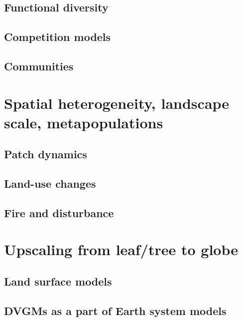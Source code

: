 \documentclass[]{book}
\begin{document}

\section{Functional diversity}\label{functional-diversity}

\section{Competition models}\label{competition-models}

\section{Communities}\label{communities}

\chapter{Spatial heterogeneity, landscape scale,
metapopulations}\label{spatial-heterogeneity-landscape-scale-metapopulations}


\section{Patch dynamics}\label{patch-dynamics}

\section{Land-use changes}\label{land-use-changes}

\section{Fire and disturbance}\label{fire-and-disturbance}

\chapter{Upscaling from leaf/tree to
globe}\label{upscaling-from-leaftree-to-globe}


\section{Land surface models}\label{land-surface-models}

\section{DVGMs as a part of Earth system
models}\label{dvgms-as-a-part-of-earth-system-models}
\end{document}
